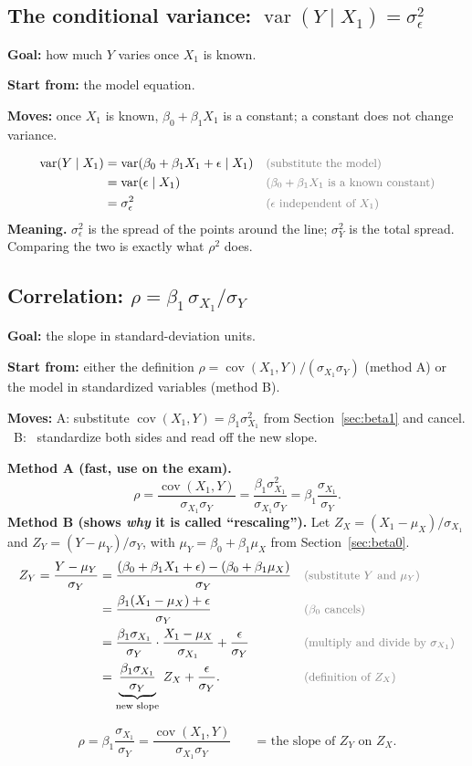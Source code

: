 \documentclass[11pt]{article}
\newcommand{\Var}{\operatorname{var}}
\newcommand{\Cov}{\operatorname{cov}}
\newcommand{\given}{\mid}
\newcommand{\why}[1]{&&\text{\small\color{gray}(#1)}}
\newcommand{\mv}[1]{\tcbox[on line, colback=methodclr, colframe=methodclr, coltext=white, boxsep=0pt,
  left=2pt, right=2pt, top=1pt, bottom=1pt, arc=1.5pt]{\sffamily\scriptsize\bfseries M#1}}
\newcommand{\goal}[1]{\textbf{Goal:} #1\par}
\newcommand{\start}[1]{\textbf{Start from:} #1\par}
\newcommand{\moves}[1]{\textbf{Moves:} #1\par}
\begin{document}
\subsection{The conditional variance: $\Var(Y\given X_1)=\sigma_\epsilon^2$}\label{sec:condvar}
\begin{methodbox}
\goal{how much $Y$ varies once $X_1$ is known.}
\start{the model equation.}
\moves{\mv{5} once $X_1$ is known, $\beta_0+\beta_1X_1$ is a constant; \mv{4} a constant does not change variance.}
\end{methodbox}
\begin{align*}
\Var(Y\given X_1)&=\Var(\beta_0+\beta_1X_1+\epsilon\given X_1) \why{substitute the model}\\
&=\Var(\epsilon\given X_1) \why{$\beta_0+\beta_1X_1$ is a known constant}\\
&=\sigma_\epsilon^2 \why{$\epsilon$ independent of $X_1$}
\end{align*}
\textbf{Meaning.} $\sigma_\epsilon^2$ is the spread of the points around the line; $\sigma_Y^2$ is the total spread. Comparing the two is
exactly what $\rho^2$ does.

\subsection{Correlation: $\rho=\beta_1\,\sigma_{X_1}/\sigma_Y$}\label{sec:rho}
\begin{methodbox}
\goal{the slope in standard-deviation units.}
\start{either the definition $\rho=\Cov(X_1,Y)/(\sigma_{X_1}\sigma_Y)$ (method A) or the model in standardized variables (method B).}
\moves{A: substitute $\Cov(X_1,Y)=\beta_1\sigma_{X_1}^2$ from Section~\ref{sec:beta1} and cancel. \ B: \mv{1}\,\mv{6} standardize both
sides and read off the new slope.}
\end{methodbox}
\textbf{Method A (fast, use on the exam).}
\[
\rho=\frac{\Cov(X_1,Y)}{\sigma_{X_1}\sigma_Y}=\frac{\beta_1\sigma_{X_1}^2}{\sigma_{X_1}\sigma_Y}=\beta_1\frac{\sigma_{X_1}}{\sigma_Y}.
\]
\textbf{Method B (shows \emph{why} it is called ``rescaling'').} Let $Z_X=(X_1-\mu_X)/\sigma_{X_1}$ and $Z_Y=(Y-\mu_Y)/\sigma_Y$, with
$\mu_Y=\beta_0+\beta_1\mu_X$ from Section~\ref{sec:beta0}.
\begin{align*}
Z_Y=\frac{Y-\mu_Y}{\sigma_Y}
&=\frac{(\beta_0+\beta_1X_1+\epsilon)-(\beta_0+\beta_1\mu_X)}{\sigma_Y} \why{substitute $Y$ and $\mu_Y$}\\
&=\frac{\beta_1(X_1-\mu_X)+\epsilon}{\sigma_Y} \why{$\beta_0$ cancels}\\
&=\frac{\beta_1\sigma_{X_1}}{\sigma_Y}\cdot\frac{X_1-\mu_X}{\sigma_{X_1}}+\frac{\epsilon}{\sigma_Y} \why{multiply and divide by $\sigma_{X_1}$}\\
&=\underbrace{\frac{\beta_1\sigma_{X_1}}{\sigma_Y}}_{\text{new slope}}\,Z_X+\frac{\epsilon}{\sigma_Y}. \why{definition of $Z_X$}
\end{align*}
\begin{keybox}
\[\rho=\beta_1\frac{\sigma_{X_1}}{\sigma_Y}=\frac{\Cov(X_1,Y)}{\sigma_{X_1}\sigma_Y}
\qquad\text{= the slope of $Z_Y$ on $Z_X$.}\]
\end{keybox}
\end{document}
